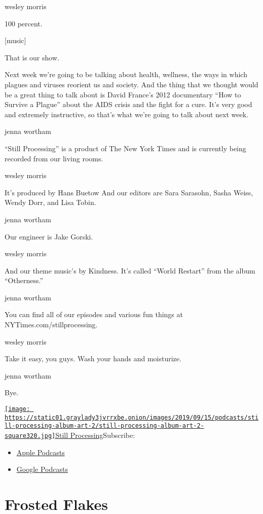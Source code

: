 wesley morris

100 percent.

{[}music{]}

That is our show.

Next week we're going to be talking about health, wellness, the ways in
which plagues and viruses reorient us and society. And the thing that we
thought would be a great thing to talk about is David France's 2012
documentary ``How to Survive a Plague'' about the AIDS crisis and the
fight for a cure. It's very good and extremely instructive, so that's
what we're going to talk about next week.

jenna wortham

``Still Processing'' is a product of The New York Times and is currently
being recorded from our living rooms.

wesley morris

It's produced by Hans Buetow And our editors are Sara Sarasohn, Sasha
Weiss, Wendy Dorr, and Lisa Tobin.

jenna wortham

Our engineer is Jake Gorski.

wesley morris

And our theme music's by Kindness. It's called ``World Restart'' from
the album ``Otherness.''

jenna wortham

You can find all of our episodes and various fun things at
NYTimes.com/stillprocessing.

wesley morris

Take it easy, you guys. Wash your hands and moisturize.

jenna wortham

Bye.

\href{https://www.nytimes3xbfgragh.onion/column/still-processing-podcast}{\texttt{[image: https://static01.graylady3jvrrxbe.onion/images/2019/09/15/podcasts/still-processing-album-art-2/still-processing-album-art-2-square320.jpg]}Still
Processing}Subscribe:

\begin{itemize}
\tightlist
\item
  \href{https://itunes.apple.com/us/podcast/id1151436460}{Apple
  Podcasts}
\item
  \href{https://www.google.com/podcasts?feed=aHR0cHM6Ly9yc3MuYXJ0MTkuY29tL255dC1zdGlsbC1wcm9jZXNzaW5n}{Google
  Podcasts}
\end{itemize}

\hypertarget{frosted-flakes-1}{%
\section{Frosted Flakes}\label{frosted-flakes-1}}

